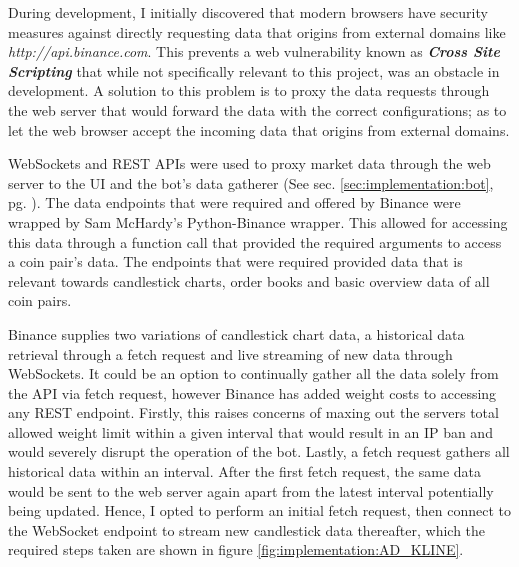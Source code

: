 \noindent During development, I initially discovered that modern browsers have security measures against directly requesting data that origins from external domains like \textit{http://api.binance.com}. This prevents a web vulnerability known as \textit{\textbf{Cross Site Scripting}} that while not specifically relevant to this project, was an obstacle in development. A solution to this problem is to proxy the data requests through the web server that would forward the data with the correct configurations; as to let the web browser accept the incoming data that origins from external domains.

WebSockets and REST APIs were used to proxy market data through the web server to the UI and the bot's data gatherer (See sec. \ref{sec:implementation:bot}, pg. \pageref{sec:implementation:bot}). The data endpoints that were required and offered by Binance were wrapped by Sam McHardy's \cite{MISC:Python-Binance} Python-Binance wrapper. This allowed for accessing this data through a function call that provided the required arguments to access a coin pair's data. The endpoints that were required provided data that is relevant towards candlestick charts, order books and basic overview data of all coin pairs.

Binance supplies two variations of candlestick chart data, a historical data retrieval through a fetch request and live streaming of new data through WebSockets. It could be an option to continually gather all the data solely from the API via fetch request, however Binance has added weight costs to accessing any REST endpoint. Firstly, this raises concerns of maxing out the servers total allowed weight limit within a given interval that would result in an IP ban and would severely disrupt the operation of the bot. Lastly, a fetch request gathers all historical data within an interval. After the first fetch request, the same data would be sent to the web server again apart from the latest interval potentially being updated. Hence, I opted to perform an initial fetch request, then connect to the WebSocket endpoint to stream new candlestick data thereafter, which the required steps taken are shown in figure \ref{fig:implementation:AD_KLINE}. 

